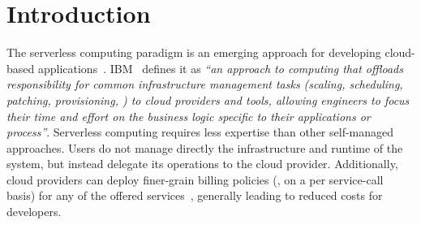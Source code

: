 \section{Introduction}

The serverless computing paradigm is an emerging approach for developing cloud-based applications~\cite{Baldini2017, riseofserverless, vanEyk:2017:SCG:3154847.3154848}.
\gls{IBM}~\cite{serverlessibm} defines it as \emph{``an approach to computing that offloads responsibility for common infrastructure management tasks (scaling, scheduling, patching, provisioning, \etc) to cloud providers and tools, allowing engineers to focus their time and effort on the business logic specific to their applications or process''}.
Serverless computing requires less expertise than other self-managed approaches.
Users do not manage directly the infrastructure and runtime of the system, but instead delegate its operations to the cloud provider.
Additionally, cloud providers can deploy finer-grain billing policies (\eg, on a per service-call basis) for any of the offered services~\cite{serverlessaws, serverlessazure}, generally leading to reduced costs for developers.

